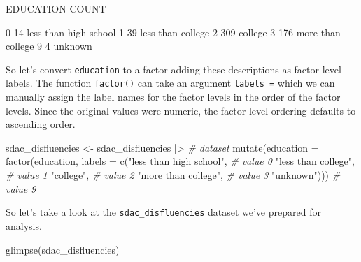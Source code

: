 \documentclass[
  letterpaper,
]{latex/krantz}
\newenvironment{Shaded}{\begin{snugshade}}{\end{snugshade}}
\newcommand{\AttributeTok}[1]{\textcolor[rgb]{0.00,0.00,0.00}{#1}}
\newcommand{\CommentTok}[1]{\textcolor[rgb]{0.00,0.00,0.00}{\textit{#1}}}
\newcommand{\FunctionTok}[1]{\textcolor[rgb]{0.00,0.00,0.00}{#1}}
\newcommand{\NormalTok}[1]{\textcolor[rgb]{0.00,0.00,0.00}{#1}}
\newcommand{\OtherTok}[1]{\textcolor[rgb]{0.00,0.00,0.00}{#1}}
\newcommand{\SpecialCharTok}[1]{\textcolor[rgb]{0.00,0.00,0.00}{#1}}
\newcommand{\StringTok}[1]{\textcolor[rgb]{0.00,0.00,0.00}{#1}}
\begin{document}
\begin{Shaded}
\begin{Highlighting}[]
\NormalTok{EDUCATION    COUNT}
\NormalTok{{-}{-}{-}{-}{-}{-}{-}{-}{-}{-}{-}{-}{-}{-}{-}{-}{-}{-}{-}{-}}

\NormalTok{0            14      less than high school}
\NormalTok{1            39      less than college}
\NormalTok{2            309     college}
\NormalTok{3            176     more than college}
\NormalTok{9            4       unknown}
\end{Highlighting}
\end{Shaded}

So let's convert \texttt{education} to a factor adding these
descriptions as factor level labels. The function \texttt{factor()} can
take an argument \texttt{labels\ =} which we can manually assign the
label names for the factor levels in the order of the factor levels.
Since the original values were numeric, the factor level ordering
defaults to ascending order.

\begin{Shaded}
\begin{Highlighting}[]
\NormalTok{sdac\_disfluencies }\OtherTok{\textless{}{-}} 
\NormalTok{  sdac\_disfluencies }\SpecialCharTok{|\textgreater{}} \CommentTok{\# dataset}
  \FunctionTok{mutate}\NormalTok{(}\AttributeTok{education =} \FunctionTok{factor}\NormalTok{(education, }
                            \AttributeTok{labels =} \FunctionTok{c}\NormalTok{(}\StringTok{"less than high school"}\NormalTok{, }\CommentTok{\# value 0}
                                       \StringTok{"less than college"}\NormalTok{, }\CommentTok{\# value 1}
                                       \StringTok{"college"}\NormalTok{, }\CommentTok{\# value 2}
                                       \StringTok{"more than college"}\NormalTok{, }\CommentTok{\# value 3 }
                                       \StringTok{"unknown"}\NormalTok{))) }\CommentTok{\# value 9}
\end{Highlighting}
\end{Shaded}

So let's take a look at the \texttt{sdac\_disfluencies} dataset we've
prepared for analysis.

\begin{Shaded}
\begin{Highlighting}[]
\FunctionTok{glimpse}\NormalTok{(sdac\_disfluencies)}
\end{Highlighting}
\end{Shaded}
\end{document}
